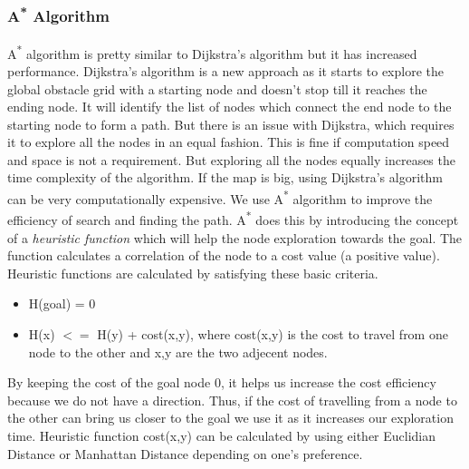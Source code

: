 \subsubsection{A\textsuperscript{*} Algorithm}
A\textsuperscript{*} algorithm is pretty similar to Dijkstra's algorithm but it has increased performance. Dijkstra's algorithm is a new approach as it starts to explore the global obstacle grid with a starting node and doesn't stop till it reaches the ending node.
It will identify the list of nodes which connect the end node to the starting node to form a path. But there is an issue with Dijkstra, which requires it to explore all the nodes in an equal fashion. This is fine if computation speed and space is not a requirement. 
But exploring all the nodes equally increases the time complexity of the algorithm. If the map is big, using Dijkstra's algorithm can be very computationally expensive. We use A\textsuperscript{*} algorithm to improve the efficiency of search and finding the path.
A\textsuperscript{*} does this by introducing the concept of a \textit{heuristic function} which will help the node exploration towards the goal. The function calculates a correlation of the node to a cost value (a positive value). 
Heuristic functions are calculated by satisfying these basic criteria.

\begin{itemize}
    \item H(goal) = 0
    \item H(x) $<=$ H(y) + cost(x,y), where cost(x,y) is the cost to travel from one node to the other and x,y are the two adjecent nodes. 
\end{itemize}

By keeping the cost of the goal node 0, it helps us increase the cost efficiency because we do not have a direction. Thus, if the cost of travelling from a node to the other can bring us closer to the goal we use it as it increases our exploration time.
Heuristic function cost(x,y) can be calculated by using either Euclidian Distance or Manhattan Distance depending on one's preference. 
